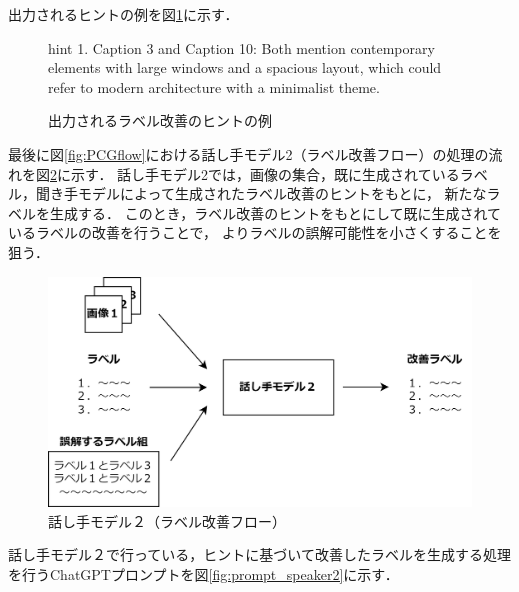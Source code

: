 \documentclass[a4paper,11pt]{jreport}
\begin{document}
出力されるヒントの例を図\ref{fig:hint_example}に示す．

\begin{figure}[H]
  \begin{mdframed}[linewidth=1pt]
    hint 1. Caption 3 and Caption 10: Both mention contemporary elements with large windows and a spacious layout, which could refer to modern architecture with a minimalist theme.
  \end{mdframed}
  \caption{出力されるラベル改善のヒントの例}
  \label{fig:hint_example}
\end{figure}

最後に図\ref{fig:PCGflow}における話し手モデル2（ラベル改善フロー）の処理の流れを図\ref{fig:PCGspeaker2}に示す．
話し手モデル2では，画像の集合，既に生成されているラベル，聞き手モデルによって生成されたラベル改善のヒントをもとに，
新たなラベルを生成する．
このとき，ラベル改善のヒントをもとにして既に生成されているラベルの改善を行うことで，
よりラベルの誤解可能性を小さくすることを狙う．

\begin{figure}[H]
	\centering
	\includegraphics[width=0.8\linewidth]{figures/PCGspeaker2.png}
	\caption{話し手モデル２（ラベル改善フロー）}
	\label{fig:PCGspeaker2}
\end{figure}

話し手モデル２で行っている，ヒントに基づいて改善したラベルを生成する処理を行うChatGPTプロンプトを図\ref{fig:prompt_speaker2}に示す．
\end{document}
